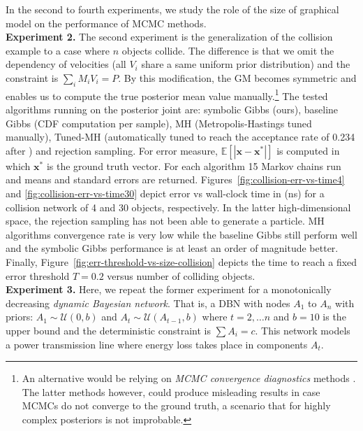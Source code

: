 \documentclass[letterpaper]{article}
\newcommand{\bvec}[1]{\textbf{#1}}
\begin{document}
In the second to fourth experiments, we study the role of the size of graphical model on the performance of MCMC methods.
\\
\textbf{Experiment 2.} The second experiment is the generalization of the collision example to a case where $n$ objects 
collide. The difference is that we omit the dependency of velocities (all $V_i$ share a same uniform prior distribution) and the constraint is $\sum_i{M_i V_i} = P$. By this modification, the GM becomes symmetric and enables us to compute the true posterior mean value manually.\footnote{An alternative would be relying on \emph{MCMC convergence diagnostics} methods \cite{cowles1996markov}. The latter methods however, could produce misleading results in case MCMCs do not converge to the ground truth, a scenario that for highly complex posteriors is not improbable.} 
The tested algorithms running on the posterior joint are: symbolic Gibbs (ours), baseline Gibbs (CDF computation per sample), 
MH (Metropolis-Hastings tuned manually), Tuned-MH 
(automatically tuned to reach the acceptance rate of 0.234 after \cite{roberts1997weak}) and rejection sampling.
For error measure, $\mathbb{E}[|\bvec{x} - \bvec{x}^*|]$ is computed in which 
$\bvec{x}^*$ is the ground truth vector.
For each algorithm 15 Markov chains run and means and standard errors are returned.     
Figures~\ref{fig:collision-err-vs-time4} 
and 
\ref{fig:collision-err-vs-time30} 
depict error vs wall-clock time in (ns) %
for a collision network of 4 and 30 objects, respectively. %
In the latter high-dimensional space, the rejection sampling has not been able to generate a particle.
MH algorithms convergence rate is very low while the baseline Gibbs still perform well and the symbolic Gibbs performance is at least an order of magnitude better.
Finally, Figure~\ref{fig:err-threshold-vs-size-collision} depicts the time to reach a fixed error threshold $T=0.2$ 
versus number of colliding objects. 
%
\\
\textbf{Experiment 3.} Here, we repeat the former experiment for a 
monotonically decreasing \emph{dynamic Bayesian network}. That is, a DBN with nodes $A_1$ to $A_n$
with priors: $A_1 \sim \mathcal{U}(0, b)$ and $A_t \sim \mathcal{U}(A_{t-1}, b)$ where 
$t = 2, \ldots n$ and $b=10$ is the upper bound and the deterministic constraint is $\sum A_i = c$.
This network models a power transmission line where energy loss takes place in components $A_t$.
\end{document}
